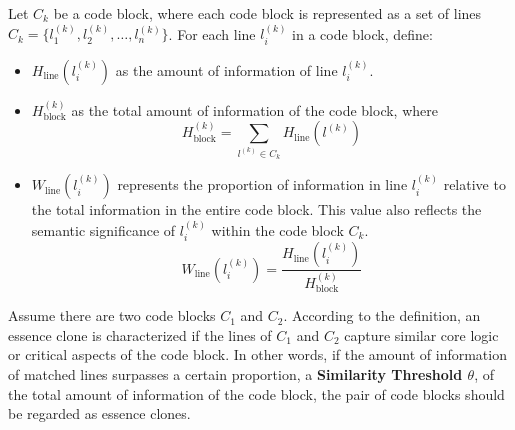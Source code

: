 Let $ C_k $ be a code block, where each code block is represented as a set of lines $ C_k = \{l_1^{(k)}, l_2^{(k)}, \ldots, l_n^{(k)}\} $.
For each line $ l_i^{(k)} $ in a code block, define:
\begin{itemize}
    \item $ H_{\text{line}}(l_i^{(k)}) $ as the amount of information of line $ l_i^{(k)} $.
    \item $ H_{\text{block}}^{(k)}$ as the total amount of information of the code block, where $$ 
        H_{\text{block}}^{(k)} = \sum_{l^{(k)} \in C_k} H_{\text{line}}(l^{(k)}) 
        $$
    \item $ W_{\text{line}}(l_i^{(k)}) $ represents the proportion of information in line $ l_i^{(k)} $ relative to the total information in the entire code block. This value also reflects the semantic significance of $ l_i^{(k)} $ within the code block $C_k$.
        $$
        W_{\text{line}}(l_i^{(k)}) = \frac{H_{\text{line}}(l_i^{(k)})}{H_{\text{block}}^{(k)}}
        $$
\end{itemize}

Assume there are two code blocks $ C_1 $ and $ C_2 $. 
According to the definition, an essence clone is characterized if the lines of $ C_1$ and $ C_2 $ capture similar core logic or critical aspects of the code block. In other words, if the amount of information of matched lines surpasses a certain proportion, a \textbf{Similarity Threshold $\theta$},  of the total amount of information of the code block, the pair of code blocks should be regarded as essence clones.


